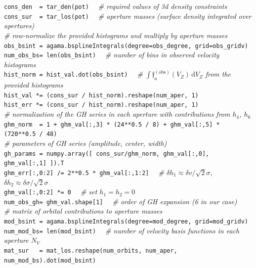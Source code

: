 \documentclass[12pt]{article}
\renewcommand{\d}{\mathrm{d}}
\begin{document}
\texttt{cons_den~~= tar_den(pot)}
\textit{\color{Sepia} \ \ \# required values of 3d density constraints}\\
\texttt{cons_sur~~= tar_los(pot)}
\textit{\color{Sepia} \ \ \# aperture masses (surface density integrated over apertures)}\\[1mm]
\textit{\color{Sepia}\# row-normalize the provided histograms and multiply by aperture masses}\\
\texttt{obs_bsint~= agama.bsplineIntegrals(degree=obs_degree, grid=obs_gridv)}\\
\texttt{num_obs_bs= len(obs_bsint)}
\textit{\color{Sepia}\ \ \# number of bins in observed velocity histograms}\\
\texttt{hist_norm~= hist_val.dot(obs_bsint)}
\textit{\color{Sepia} \ \ \# $\int \mathfrak f_a^\mathrm{(obs)}(V_Z)\, \d V_Z$ from the provided histograms}\\
\texttt{hist_val *= (cons_sur / hist_norm).reshape(num_aper, 1)}\\
\texttt{hist_err *= (cons_sur / hist_norm).reshape(num_aper, 1)}\\[1mm]
\textit{\color{Sepia}\# normalization of the GH series in each aperture with contributions from $h_4$, $h_6$}\\
\texttt{ghm_norm~~= 1 + ghm_val[:,3] * (24**0.5 / 8) + ghm_val[:,5] * (720**0.5 / 48)}\\
\textit{\color{Sepia}\# parameters of GH series (amplitude, center, width)}\\
\texttt{gh_params~= numpy.array([ cons_sur/ghm_norm, ghm_val[:,0], ghm_val[:,1] ]).T}\\
\texttt{ghm_err[:,0:2] /= 2**0.5 * ghm_val[:,1:2]}
\textit{\color{Sepia}\ \ \# $\delta h_1 \approx \delta v / \sqrt{2}\sigma$, $\delta h_2 \approx \delta \sigma / \sqrt{2}\sigma$}\\
\texttt{ghm_val[:,0:2] *= 0} \textit{\color{Sepia}\ \ \# set $h_1=h_2=0$}\\
\texttt{num_obs_gh= ghm_val.shape[1]} 
\textit{\color{Sepia}\ \ \# order of GH expansion (6 in our case)}\\[1mm]
\textit{\color{Sepia}\# matrix of orbital contributions to aperture masses}\\
\texttt{mod_bsint = agama.bsplineIntegrals(degree=mod_degree, grid=mod_gridv)}\\
\texttt{num_mod_bs= len(mod_bsint)}
\textit{\color{Sepia}\ \ \# number of velocity basis functions in each aperture $N_V$}\\
\texttt{mat_sur~~~= mat_los.reshape(num_orbits, num_aper, num_mod_bs).dot(mod_bsint)}\\[2mm]
\end{document}
